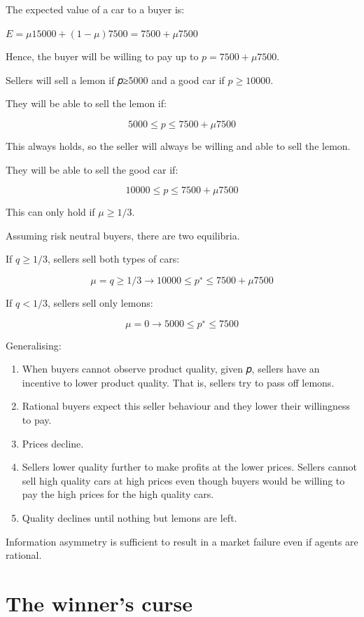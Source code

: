 \documentclass[
  letterpaper,
  DIV=11,
  numbers=noendperiod]{scrreprt}
\begin{document}
The expected value of a car to a buyer is:

\(E=\mu 15000+(1−\mu)7500=7500+\mu 7500\)

Hence, the buyer will be willing to pay up to \(p=7500+\mu 7500\).

Sellers will sell a lemon if 𝑝≥5000 and a good car if \(p≥10000\).

They will be able to sell the lemon if:

\[
5000≤p≤7500+\mu7500
\]

This always holds, so the seller will always be willing and able to sell
the lemon.

They will be able to sell the good car if:

\[
10000≤p≤7500+\mu7500
\]

This can only hold if \(\mu≥1/3\).

Assuming risk neutral buyers, there are two equilibria.

If \(q≥1/3\), sellers sell both types of cars:

\[
\mu=q≥1/3→10000≤p^∗≤7500+\mu7500
\]

If \(q<1/3\), sellers sell only lemons:

\[
𝜇=0→5000≤p^∗≤7500
\]

Generalising:

\begin{enumerate}
\def\labelenumi{\arabic{enumi}.}
\item
  When buyers cannot observe product quality, given 𝑝, sellers have an
  incentive to lower product quality. That is, sellers try to pass off
  lemons.
\item
  Rational buyers expect this seller behaviour and they lower their
  willingness to pay.
\item
  Prices decline.
\item
  Sellers lower quality further to make profits at the lower prices.
  Sellers cannot sell high quality cars at high prices even though
  buyers would be willing to pay the high prices for the high quality
  cars.
\item
  Quality declines until nothing but lemons are left.
\end{enumerate}

Information asymmetry is sufficient to result in a market failure even
if agents are rational.

\hypertarget{the-winners-curse}{%
\section{The winner's curse}\label{the-winners-curse}}
\end{document}
